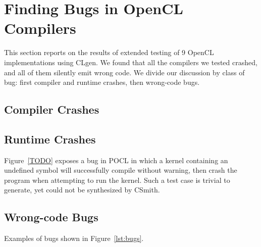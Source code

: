 \section{Finding Bugs in OpenCL Compilers}

This section reports on the results of extended testing of 9 OpenCL implementations using CLgen. We found that all the compilers we tested crashed, and all of them silently emit wrong code. We divide our discussion by class of bug: first compiler and runtime crashes, then wrong-code bugs.

\subsection{Compiler Crashes}


\subsection{Runtime Crashes}

Figure~\ref{TODO} exposes a bug in POCL in which a kernel containing an undefined symbol will successfully compile without warning, then crash the program when attempting to run the kernel. Such a test case is trivial to generate, yet could not be synthesized by CSmith.

\subsection{Wrong-code Bugs}

Examples of bugs shown in Figure~\ref{lst:bugs}.


